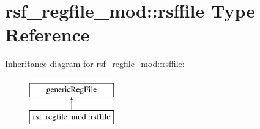 \hypertarget{structrsf__regfile__mod_1_1rsffile}{}\section{rsf\+\_\+regfile\+\_\+mod\+:\+:rsffile Type Reference}
\label{structrsf__regfile__mod_1_1rsffile}
Inheritance diagram for rsf\+\_\+regfile\+\_\+mod\+:\+:rsffile\+:\begin{figure}[H]
\begin{center}
\leavevmode
\includegraphics[height=2.000000cm]{structrsf__regfile__mod_1_1rsffile}
\end{center}
\end{figure}
